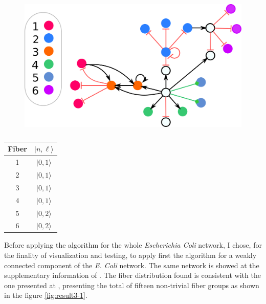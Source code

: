 \documentclass[12pt]{diazessay} %
\begin{document}
\begin{figure}[H]
	\centering
	\includegraphics[scale=0.275]{Figures/result2-label.png}
\end{figure}

\begin{table}[H]
\centering
\begin{tabular}[b]{cc}\hline
	Fiber & $| n, \ell \rangle$  \\ \hline
	1 & $| 0, 1 \rangle$ \\
	2 & $| 0, 1 \rangle$ \\
	3 & $| 0, 1 \rangle$ \\ 
	4 & $| 0, 1 \rangle$ \\
	5 & $| 0, 2 \rangle$ \\
	6 & $| 0, 2 \rangle$ \\ \hline
  \end{tabular}
  \caption{}
  \label{tab:r2}
\end{table}

Before applying the algorithm for the whole \textit{Escherichia Coli} network, I chose, for the finality of visualization and testing, to apply first the algorithm for a weakly connected component of the \textit{E. Coli} network. The same network is showed at the supplementary information of \cite{fibration2019}. The fiber distribution found is consistent with the one presented at \cite{fibration2019}, presenting the total of fifteen non-trivial fiber groups as shown in the figure \ref{fig:result3-1}.
\end{document}
